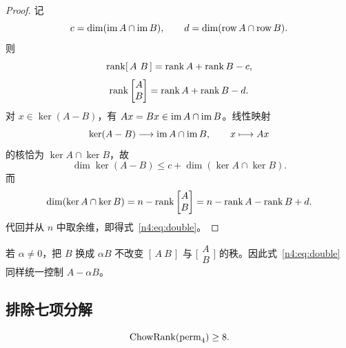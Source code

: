 \begin{proof}
记
\[
  c=\dim(\operatorname{im} A\cap\operatorname{im} B),\qquad
  d=\dim(\operatorname{row} A\cap\operatorname{row} B).
\]
则
\[
  \operatorname{rank}[\,A\ B\,]=\operatorname{rank} A+\operatorname{rank} B-c,
\]
\[
  \operatorname{rank}\begin{bmatrix}A\\B\end{bmatrix}
  =\operatorname{rank} A+\operatorname{rank} B-d.
\]
对 \(x\in\ker(A-B)\)，有 \(Ax=Bx\in\operatorname{im} A\cap\operatorname{im} B\)。线性映射
\[
  \ker(A-B)\longrightarrow\operatorname{im} A\cap\operatorname{im} B,\qquad x\longmapsto Ax
\]
的核恰为 \(\ker A\cap\ker B\)，故
\[
  \dim\ker(A-B)\leq c+\dim(\ker A\cap\ker B).
\]
而
\[
  \dim(\ker A\cap\ker B)
  =n-\operatorname{rank}\begin{bmatrix}A\\B\end{bmatrix}
  =n-\operatorname{rank} A-\operatorname{rank} B+d.
\]
代回并从 \(n\) 中取余维，即得式~\eqref{n4:eq:double}。
\end{proof}

\begin{remark}\label{n4:rem:scaling}
若 \(\alpha\neq0\)，把 \(B\) 换成 \(\alpha B\) 不改变
\([\,A\ B\,]\) 与 \(\bigl[\begin{smallmatrix}A\\B\end{smallmatrix}\bigr]\)
的秩。因此式~\eqref{n4:eq:double} 同样统一控制 \(A-\alpha B\)。
\end{remark}

\subsection{排除七项分解}\label{n4:sec:lower}

\begin{theorem}\label{n4:thm:lower}
\[
  \operatorname{ChowRank}(\operatorname{perm}_4)\geq8.
\]
\end{theorem}

